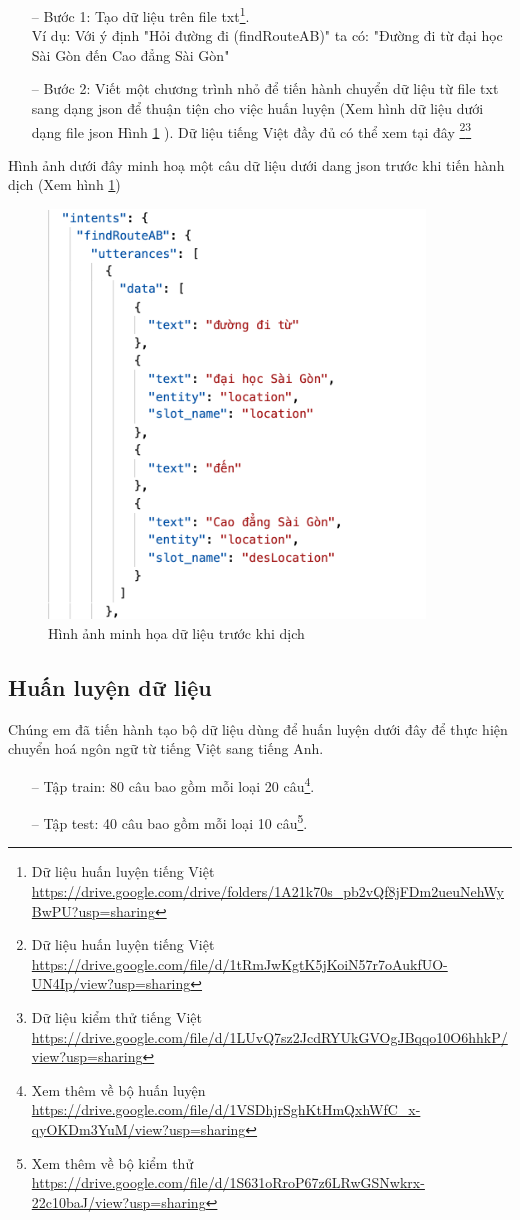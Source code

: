\begin{itemize}
    \item[--] Bước 1: Tạo dữ liệu trên file txt\footnote{Dữ liệu huấn luyện tiếng Việt \url{https://drive.google.com/drive/folders/1A21k70s_pb2vQf8jFDm2ueuNehWyBwPU?usp=sharing}}. 
    \\Ví dụ: Với ý định "Hỏi đường đi (findRouteAB)" ta có: "Đường đi từ đại học Sài Gòn đến Cao đẳng Sài Gòn"
    \item[--] Bước 2: Viết một chương trình nhỏ để tiến hành chuyển dữ liệu từ file txt sang dạng json để thuận tiện cho việc huấn luyện (Xem hình dữ liệu dưới dạng file json Hình \ref{fig:data-train-json} ). Dữ liệu tiếng Việt đầy đủ có thể xem tại đây \footnote{Dữ liệu huấn luyện tiếng Việt \url{https://drive.google.com/file/d/1tRmJwKgtK5jKoiN57r7oAukfUO-UN4Ip/view?usp=sharing}}\footnote{Dữ liệu kiểm thử tiếng Việt \url{https://drive.google.com/file/d/1LUvQ7sz2JcdRYUkGVOgJBqqo10O6hhkP/view?usp=sharing}}
\end{itemize}
Hình ảnh dưới đây minh hoạ một câu dữ liệu dưới dang json trước khi tiến hành dịch (Xem hình \ref{fig:data-train-json})
\begin{figure}[H]
    \centering
    \includegraphics[width=10cm]{images/Data-train-json.png}
    \caption{Hình ảnh minh họa dữ liệu trước khi dịch}
    \label{fig:data-train-json}
\end{figure}
\subsection{Huấn luyện dữ liệu}
Chúng em đã tiến hành tạo bộ dữ liệu dùng để huấn luyện dưới đây để thực hiện chuyển hoá ngôn ngữ từ tiếng Việt sang tiếng Anh.
\begin{itemize}
    \item[--] Tập train: 80 câu bao gồm mỗi loại 20 câu\footnote{Xem thêm về bộ huấn luyện \url{https://drive.google.com/file/d/1VSDhjrSghKtHmQxhWfC_x-qyOKDm3YuM/view?usp=sharing}}.
    \item[--] Tập test: 40 câu bao gồm mỗi loại 10 câu\footnote{Xem thêm về bộ kiểm thử \url{https://drive.google.com/file/d/1S631oRroP67z6LRwGSNwkrx-22c10baJ/view?usp=sharing}}.
\end{itemize}

